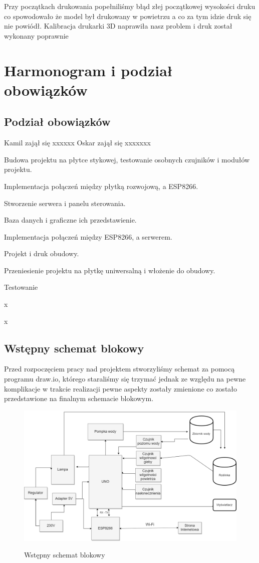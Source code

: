\documentclass[12pt]{article}
\begin{document}
Przy początkach drukowania popełniliśmy błąd złej początkowej wysokości druku co spowodowało że model był drukowany w powietrzu a co za tym idzie druk się nie powiódł. Kalibracja drukarki 3D naprawiła nasz problem i druk został wykonany poprawnie


\newpage
\section{Harmonogram i podział obowiązków}

\subsection{Podział obowiązków}
Kamil zajął się xxxxxx
Oskar zajął się xxxxxxx

Budowa projektu na płytce stykowej, testowanie osobnych czujników i modułów projektu.

Implementacja połączeń między płytką rozwojową, a ESP8266.

Stworzenie serwera i panelu sterowania. 

Baza danych i graficzne ich przedstawienie.

Implementacja połączeń między ESP8266, a serwerem.

Projekt i druk obudowy.

Przeniesienie projektu na płytkę uniwersalną i włożenie do obudowy.
 
Testowanie

x

x
\subsection{Wstępny schemat blokowy}
Przed rozpoczęciem pracy nad projektem stworzyliśmy schemat za pomocą programu draw.io, którego staraliśmy się trzymać jednak ze względu na pewne komplikacje w trakcie realizacji pewne aspekty zostały zmienione co zostało przedstawione na finalnym schemacie blokowym.
\begin{figure}[!h]
	\begin{center}
		{\includegraphics[width=16cm]{schemat_blokowy.png}}
	\end{center}
	\caption{Wstępny schemat blokowy}
\end{figure}
\end{document}
